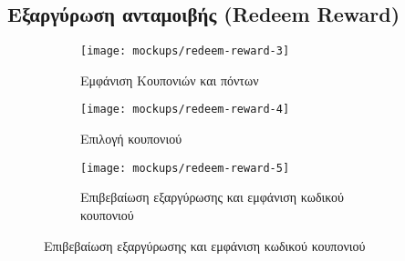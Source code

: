 \newpage
\subsection{Εξαργύρωση ανταμοιβής (Redeem Reward)}

\begin{figure}[H]
    \centering
    \begin{subfigure}[b]{0.3\textwidth}
        \texttt{[image: mockups/redeem-reward-3]}
        \caption{Εμφάνιση Κουπονιών και πόντων}
    \end{subfigure}
    \hfill
    \begin{subfigure}[b]{0.3\textwidth}
        \texttt{[image: mockups/redeem-reward-4]}
        \caption{Επιλογή κουπονιού}
    \end{subfigure}
    \hfill
    \begin{subfigure}[b]{0.3\textwidth}
        \texttt{[image: mockups/redeem-reward-5]}
        \caption{Επιβεβαίωση εξαργύρωσης και εμφάνιση κωδικού κουπονιού}
    \end{subfigure}
\end{figure}



